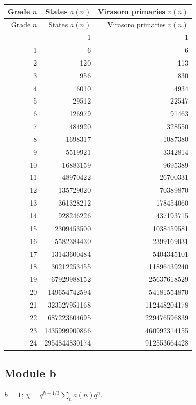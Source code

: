 \begingroup\small
\setlength{\tabcolsep}{5pt}
\begin{longtable}{@{}rrr@{}}
\toprule
Grade $n$ & States $a(n)$ & Virasoro primaries $v(n)$\\
\midrule\endfirsthead
\toprule
Grade $n$ & States $a(n)$ & Virasoro primaries $v(n)$\\
\midrule\endhead
\bottomrule\endfoot
0 & 1 & 1\\
1 & 6 & 6\\
2 & 120 & 113\\
3 & 956 & 830\\
4 & 6010 & 4934\\
5 & 29512 & 22547\\
6 & 126979 & 91463\\
7 & 484920 & 328550\\
8 & 1698317 & 1087380\\
9 & 5519921 & 3342814\\
10 & 16883159 & 9695389\\
11 & 48970422 & 26700331\\
12 & 135729020 & 70389870\\
13 & 361328212 & 178454060\\
14 & 928246226 & 437193715\\
15 & 2309453500 & 1038459581\\
16 & 5582384430 & 2399169031\\
17 & 13143600484 & 5404345101\\
18 & 30212253455 & 11896439240\\
19 & 67929988152 & 25637618529\\
20 & 149654742594 & 54181554870\\
21 & 323527951168 & 112448204178\\
22 & 687223604695 & 229476596839\\
23 & 1435999900866 & 460992314155\\
24 & 2954844830174 & 912553664428\\
\end{longtable}
\endgroup

\subsection{Module b}
$h=1$; $\chi=q^{h-1/3}\sum_n a(n)q^n$.


